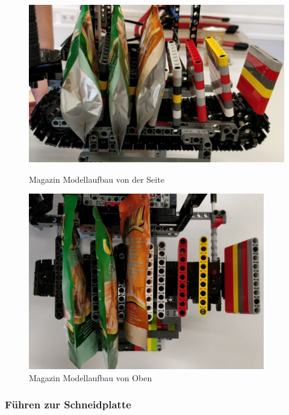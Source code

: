\begin{figure}[H]
   \begin{minipage}[hbt]{0.5\textwidth} %
      \includegraphics[width=1\textwidth]{Bilder/Ablauf_1_png/Magazin_Seitlich}
      \caption{Magazin Modellaufbau von der Seite}
      \label{Magazin Seitlich}
   \end{minipage}
   \hspace{.04\linewidth}%
   \begin{minipage}[hbt]{0.5\textwidth} %
      \includegraphics[width=0.92\textwidth]{Bilder/Ablauf_1_png/Magazin_Oben}
      \caption{Magazin Modellaufbau von Oben}
	  \label{Magazin Oben}      
      \end{minipage}
\end{figure}



\subsubsection{Führen zur Schneidplatte}

